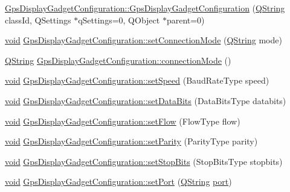\begin{DoxyCompactItemize}
\item 
\hyperlink{group___g_p_s_gadget_plugin_ga9ce38cb5c86c5783c8b96457d926f9c4}{\-Gps\-Display\-Gadget\-Configuration\-::\-Gps\-Display\-Gadget\-Configuration} (\hyperlink{group___u_a_v_objects_plugin_gab9d252f49c333c94a72f97ce3105a32d}{\-Q\-String} class\-Id, \-Q\-Settings $\ast$q\-Settings=0, \-Q\-Object $\ast$parent=0)
\item 
\hyperlink{group___u_a_v_objects_plugin_ga444cf2ff3f0ecbe028adce838d373f5c}{void} \hyperlink{group___g_p_s_gadget_plugin_ga0025e5ae0ab4f8a16c2b69a4aef3a8be}{\-Gps\-Display\-Gadget\-Configuration\-::set\-Connection\-Mode} (\hyperlink{group___u_a_v_objects_plugin_gab9d252f49c333c94a72f97ce3105a32d}{\-Q\-String} mode)
\item 
\hyperlink{group___u_a_v_objects_plugin_gab9d252f49c333c94a72f97ce3105a32d}{\-Q\-String} \hyperlink{group___g_p_s_gadget_plugin_ga77783cad102ac5a0338e0fe296402b23}{\-Gps\-Display\-Gadget\-Configuration\-::connection\-Mode} ()
\item 
\hyperlink{group___u_a_v_objects_plugin_ga444cf2ff3f0ecbe028adce838d373f5c}{void} \hyperlink{group___g_p_s_gadget_plugin_gaf15cd0543ca6d85d3593905f8e8b7301}{\-Gps\-Display\-Gadget\-Configuration\-::set\-Speed} (\-Baud\-Rate\-Type speed)
\item 
\hyperlink{group___u_a_v_objects_plugin_ga444cf2ff3f0ecbe028adce838d373f5c}{void} \hyperlink{group___g_p_s_gadget_plugin_ga30b358e2d5b28de7d18749cfb6dbf9cb}{\-Gps\-Display\-Gadget\-Configuration\-::set\-Data\-Bits} (\-Data\-Bits\-Type databits)
\item 
\hyperlink{group___u_a_v_objects_plugin_ga444cf2ff3f0ecbe028adce838d373f5c}{void} \hyperlink{group___g_p_s_gadget_plugin_ga56ec26969426f55eb39373779ba78ddb}{\-Gps\-Display\-Gadget\-Configuration\-::set\-Flow} (\-Flow\-Type flow)
\item 
\hyperlink{group___u_a_v_objects_plugin_ga444cf2ff3f0ecbe028adce838d373f5c}{void} \hyperlink{group___g_p_s_gadget_plugin_gaea8c500878652f4b518a990e0f6ee05a}{\-Gps\-Display\-Gadget\-Configuration\-::set\-Parity} (\-Parity\-Type parity)
\item 
\hyperlink{group___u_a_v_objects_plugin_ga444cf2ff3f0ecbe028adce838d373f5c}{void} \hyperlink{group___g_p_s_gadget_plugin_gae002581f291f9efae24ad5163c654909}{\-Gps\-Display\-Gadget\-Configuration\-::set\-Stop\-Bits} (\-Stop\-Bits\-Type stopbits)
\item 
\hyperlink{group___u_a_v_objects_plugin_ga444cf2ff3f0ecbe028adce838d373f5c}{void} \hyperlink{group___g_p_s_gadget_plugin_ga486451b6b46974085f14b206d4a69384}{\-Gps\-Display\-Gadget\-Configuration\-::set\-Port} (\hyperlink{group___u_a_v_objects_plugin_gab9d252f49c333c94a72f97ce3105a32d}{\-Q\-String} \hyperlink{classport}{port})

\end{DoxyCompactItemize}
